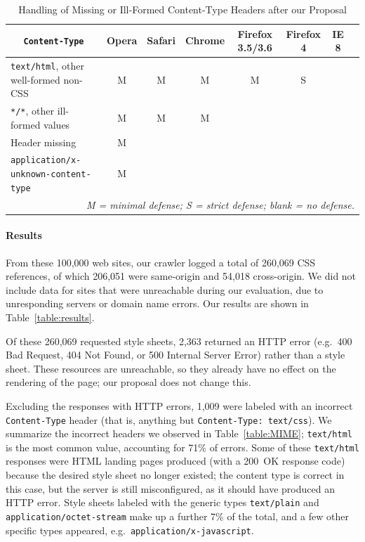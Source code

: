 \documentclass{acm_proc_article-sp}
\begin{document}
\begin{table}
\centering
\begin{tabular}{lccccccc}
\toprule
\multicolumn{1}{c}{\texttt{Content-Type}}
&Opera&Safari&Chrome&Firefox 3.5/3.6&Firefox 4&IE 8&\\
\midrule
\texttt{text/html},
other well-formed non-CSS                   & M & M & M & M & S &  & \\
\texttt{*/*}, other ill-formed values       & M & M & M &   &   &  & \\
Header missing                               & M &   &   &   &   &  & \\
\texttt{application/x-unknown-content-type} & M &   &   &   &   &  & \\
\bottomrule
\multicolumn{8}{r}{\vrule height10pt width0pt\relax\itshape
  M = minimal defense; S = strict defense; blank = no defense.}
\end{tabular}
\caption{Handling of Missing or Ill-Formed
  Content-Type Headers after our Proposal}\label{table:adoption}
\end{table}

\paragraph{Results}
From these 100,000 web sites, our crawler logged a total of 260,069
CSS references, of which 206,051 were same-origin and 54,018
cross-origin.  We did not include data for sites that were unreachable
during our evaluation, due to unresponding servers or domain name
errors. Our results are shown in Table~\ref{table:results}.

Of these 260,069 requested style sheets, 2,363 returned an HTTP error
(e.g.\ 400 Bad Request, 404 Not Found, or 500 Internal Server Error)
rather than a style sheet. These resources are unreachable, so they
already have no effect on the rendering of the page; our proposal does
not change this.

Excluding the responses with HTTP errors, 1,009 were labeled with an
incorrect \texttt{Content-Type} header (that is, anything but
\verb|Content-Type: text/css|).  We summarize the incorrect headers we
observed in Table~\ref{table:MIME}; \verb|text/html| is the most
common value, accounting for 71\% of errors.  Some of these
\verb|text/html| responses were HTML landing pages produced (with a
200~OK response code) because the desired style sheet no longer
existed; the content type is correct in this case, but the
server is still misconfigured, as it should have produced an HTTP
error.  Style sheets labeled with the generic types \verb|text/plain|
and \verb|application/octet-stream| make up a further 7\% of the
total, and a few other specific types appeared,
e.g.~\verb|application/x-javascript|.
\end{document}

